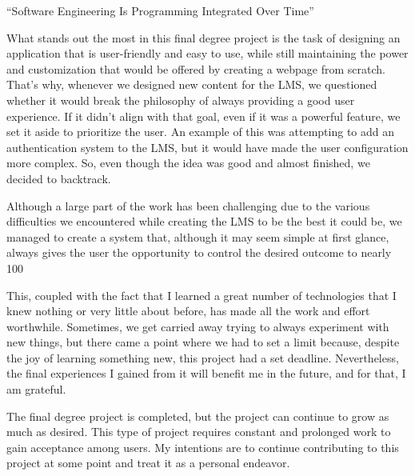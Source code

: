 ``Software Engineering Is Programming Integrated Over Time''

\bigskip
What stands out the most in this final degree project is the task of designing an application that is user-friendly and easy to use, while still maintaining the power and customization that would be offered by creating a webpage from scratch. That's why, whenever we designed new content for the LMS, we questioned whether it would break the philosophy of always providing a good user experience. If it didn't align with that goal, even if it was a powerful feature, we set it aside to prioritize the user. An example of this was attempting to add an authentication system to the LMS, but it would have made the user configuration more complex. So, even though the idea was good and almost finished, we decided to backtrack.

Although a large part of the work has been challenging due to the various difficulties we encountered while creating the LMS to be the best it could be, we managed to create a system that, although it may seem simple at first glance, always gives the user the opportunity to control the desired outcome to nearly 100%

This, coupled with the fact that I learned a great number of technologies that I knew nothing or very little about before, has made all the work and effort worthwhile. Sometimes, we get carried away trying to always experiment with new things, but there came a point where we had to set a limit because, despite the joy of learning something new, this project had a set deadline. Nevertheless, the final experiences I gained from it will benefit me in the future, and for that, I am grateful.

The final degree project is completed, but the project can continue to grow as much as desired. This type of project requires constant and prolonged work to gain acceptance among users. My intentions are to continue contributing to this project at some point and treat it as a personal endeavor.